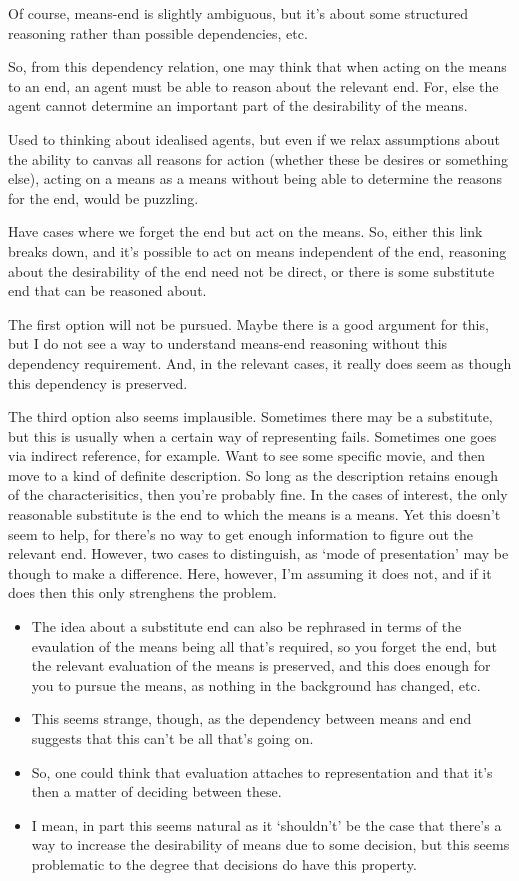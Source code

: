 \documentclass[10pt]{article}
\begin{document}
Of course, means-end is slightly ambiguous, but it's about some structured reasoning rather than possible dependencies, etc.

So, from this dependency relation, one may think that when acting on the means to an end, an agent must be able to reason about the relevant end.
For, else the agent cannot determine an important part of the desirability of the means.

Used to thinking about idealised agents, but even if we relax assumptions about the ability to canvas all reasons for action (whether these be desires or something else), acting on a means as a means without being able to determine the reasons for the end, would be puzzling.

Have cases where we forget the end but act on the means.
So, either this link breaks down, and it's possible to act on means independent of the end, reasoning about the desirability of the end need not be direct, or there is some substitute end that can be reasoned about.

The first option will not be pursued.
Maybe there is a good argument for this, but I do not see a way to understand means-end reasoning without this dependency requirement.
And, in the relevant cases, it really does seem as though this dependency is preserved.

The third option also seems implausible.
Sometimes there may be a substitute, but this is usually when a certain way of representing fails.
Sometimes one goes via indirect reference, for example.
Want to see some specific movie, and then move to a kind of definite description.
So long as the description retains enough of the characterisitics, then you're probably fine.
In the cases of interest, the only reasonable substitute is the end to which the means is a means.
Yet this doesn't seem to help, for there's no way to get enough information to figure out the relevant end.
However, two cases to distinguish, as `mode of presentation' may be though to make a difference.
Here, however, I'm assuming it does not, and if it does then this only strenghens the problem.
\begin{itemize}
\item The idea about a substitute end can also be rephrased in terms of the evaulation of the means being all that's required, so you forget the end, but the relevant evaluation of the means is preserved, and this does enough for you to pursue the means, as nothing in the background has changed, etc.
\item This seems strange, though, as the dependency between means and end suggests that this can't be all that's going on.
\item So, one could think that evaluation attaches to representation and that it's then a matter of deciding between these.
\item I mean, in part this seems natural as it `shouldn't' be the case that there's a way to increase the desirability of means due to some decision, but this seems problematic to the degree that decisions do have this property.
\end{itemize}
\end{document}
